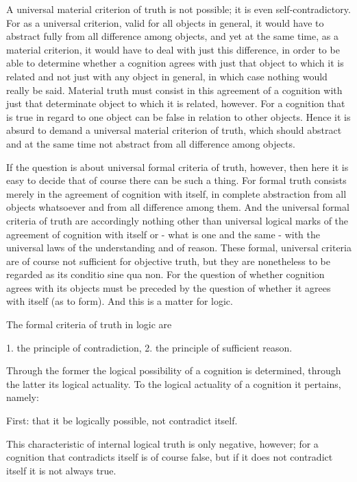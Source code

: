 A universal material criterion of truth is not possible;
it is even self-contradictory.
For as a universal criterion, valid for all objects in general, it
would have to abstract fully from all difference among objects, and yet at
the same time, as a material criterion, it would have to deal with just this
difference, in order to be able to determine whether a cognition agrees
with just that object to which it is related and not just with any object in
general, in which case nothing would really be said.
Material truth must consist in this agreement of a cognition with just that determinate object
to which it is related, however.
For a cognition that is true in regard to one
object can be false in relation to other objects.
Hence it is absurd to demand a universal material criterion of truth,
which should abstract and at the same time not abstract from all difference among objects.

If the question is about universal formal criteria of truth, however, then
here it is easy to decide that of course there can be such a thing.
For formal truth consists merely in the agreement of cognition with itself,
in complete abstraction from all objects whatsoever and from all difference among them.
And the universal formal criteria of truth are accordingly nothing
other than universal logical marks of the agreement of cognition with itself
or - what is one and the same - with the universal laws of the understanding and of reason.
These formal, universal criteria are of course not sufficient for objective truth,
but they are nonetheless to be regarded as its conditio sine qua non.
For the question of whether cognition agrees with its objects
must be preceded by the question of whether it agrees with itself (as to form).
And this is a matter for logic.

The formal criteria of truth in logic are

1. the principle of contradiction,
2. the principle of sufficient reason.

Through the former the logical possibility of a cognition is determined,
through the latter its logical actuality.
To the logical actuality of a cognition it pertains, namely:

First: that it be logically possible, not contradict itself.

    This characteristic of internal logical truth is only negative, however;
    for a cognition that contradicts itself is of course false,
    but if it does not contradict itself it is not always true.

